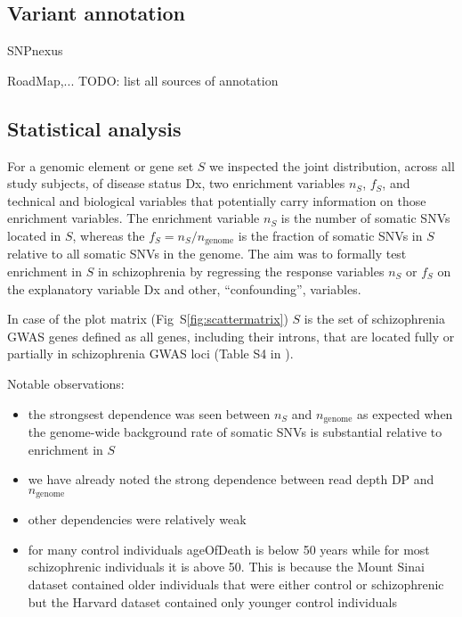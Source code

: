 \documentclass[letterpaper]{article}
\begin{document}
\subsection*{Variant annotation}

SNPnexus~\citep{Oscanoa2020}

RoadMap,... TODO: list all sources of annotation

\subsection*{Statistical analysis}

For a genomic element or gene set  \(S\) we inspected the joint distribution,
across all study subjects, of disease status Dx, two enrichment variables
\(n_S\), \(f_S\), and technical and biological variables that potentially
carry information on those enrichment variables.  The enrichment variable
\(n_S\) is the number of somatic SNVs located in \(S\), whereas the \(f_S =
	n_S/n_\mathrm{genome}\) is the fraction of somatic SNVs in \(S\)
relative to all somatic SNVs in the genome.  The aim was to formally test
enrichment in \(S\) in schizophrenia by regressing the response variables
\(n_S\) or \(f_S\) on the explanatory variable Dx
and other, ``confounding'', variables.

In case of the plot matrix (Fig~S\ref{fig:scattermatrix}) \(S\) is the set of schizophrenia GWAS genes
defined as all genes, including their introns, that are located fully or
partially in schizophrenia GWAS loci (Table S4 in \cite{Pardinas2018}).

Notable observations:
\begin{itemize}
	\item the strongsest dependence was seen between \(n_S\) and \(n_\mathrm{genome}\) as expected
		when the genome-wide background rate of somatic SNVs is
		substantial relative to enrichment in \(S\)
	\item we have already noted the strong dependence between read depth DP and
		\(n_\mathrm{genome}\)
        \item other dependencies were relatively weak
	\item for many control individuals ageOfDeath is below 50 years while for
		most schizophrenic individuals it is above 50.  This is
		because the Mount Sinai dataset contained older individuals
		that were either control or schizophrenic but the Harvard dataset contained
		only younger control individuals
\end{itemize}
\end{document}
